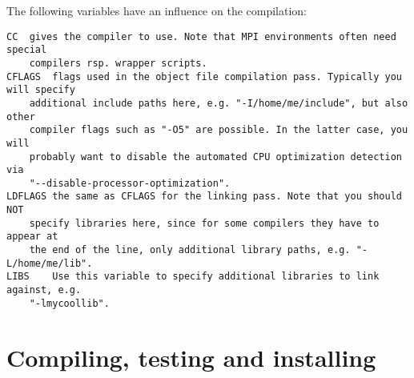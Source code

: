 The following variables have an influence on the compilation:

\begin{verbatim}
CC	gives the compiler to use. Note that MPI environments often need special
	compilers rsp. wrapper scripts.
CFLAGS	flags used in the object file compilation pass. Typically you will specify
	additional include paths here, e.g. "-I/home/me/include", but also other
	compiler flags such as "-O5" are possible. In the latter case, you will
	probably want to disable the automated CPU optimization detection via
	"--disable-processor-optimization".
LDFLAGS the same as CFLAGS for the linking pass. Note that you should NOT
	specify libraries here, since for some compilers they have to appear at
	the end of the line, only additional library paths, e.g. "-L/home/me/lib".
LIBS	Use this variable to specify additional libraries to link against, e.g.
	"-lmycoollib".
\end{verbatim}

\section{Compiling, testing and installing \es}
\label{sec:make}


